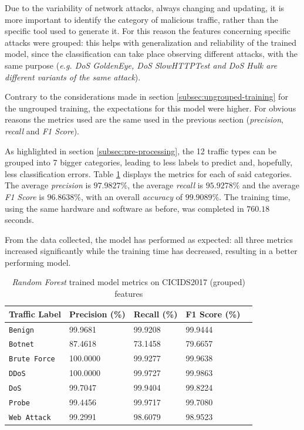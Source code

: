 Due to the variability of network attacks, always changing and updating, it is more important to identify the category of malicious traffic, rather than the specific tool used to generate it. For this reason the features concerning specific attacks were grouped: this helps with generalization and reliability of the trained model, since the classification can take place observing different attacks, with the same purpose (\textit{e.g. DoS GoldenEye, DoS SlowHTTPTest and DoS Hulk are different variants of the same attack}).
\par Contrary to the considerations made in section \ref{subsec:ungrouped-training} for the ungrouped training, the expectations for this model were higher. For obvious reasons the metrics used are the same used in the previous section (\textit{precision}, \textit{recall} and \textit{F1 Score}).
\par As highlighted in section \ref{subsec:pre-processing}, the 12 traffic types can be grouped into 7 bigger categories, leading to less labels to predict and, hopefully, less classification errors. Table \ref{tab:grouped-metrics} displays the metrics for each of said categories. The average \textit{precision} is $97.9827\%$, the average \textit{recall} is $95.9278\%$ and the average \textit{F1 Score} is $96.8638\%$, with an overall \textit{accuracy} of $99.9089\%$. The training time, using the same hardware and software as before, was completed in $760.18$ seconds.
\par From the data collected, the model has performed as expected: all three metrics increased significantly while the training time has decreased, resulting in a better performing model.

\begin{table}[h!]
   \centering
   \begin{tabular}{l|llll}
       \toprule 
       Traffic Label & Precision (\%) & Recall (\%) & F1 Score (\%) \\
       \midrule
       \rowcolor{black!10} \texttt{Benign} & 99.9681 & 99.9208 & 99.9444 \\
       \texttt{Botnet} & 87.4618 & 73.1458 & 79.6657 \\
       \rowcolor{black!10} \texttt{Brute Force} & 100.0000 & 99.9277 & 99.9638 \\
       \texttt{DDoS} & 100.0000 & 99.9727 & 99.9863 \\
       \rowcolor{black!10} \texttt{DoS} & 99.7047 & 99.9404 & 99.8224 \\
       \texttt{Probe} & 99.4456 & 99.9717 & 99.7080 \\
       \rowcolor{black!10} \texttt{Web Attack} & 99.2991 & 98.6079 & 98.9523 \\
       \bottomrule
   \end{tabular}
   \caption{\textit{Random Forest} trained model metrics on CICIDS2017 (grouped) features}
   \label{tab:grouped-metrics}
\end{table}

